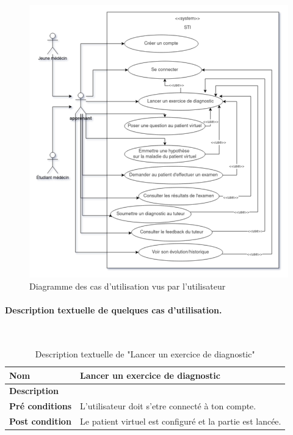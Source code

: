     \begin{figure}[H]
        \centering
        \includegraphics[width=\textwidth]{figures/context-Use case Diagram.png}
        \captionsetup{justification=centering}
        \caption{Diagramme des cas d'utilisation vus par l'utilisateur}
        \label{fig:use_case_user}
    \end{figure}
    \paragraph{Description textuelle de quelques cas d'utilisation.} \hfill \\
    
    \begin{table}[H]
        \centering
        \begin{tabular}{|p{}|p{}|}
            \hline
            \textbf{Nom} &  Lancer un exercice de diagnostic\\
            \hline
            \textbf{Description}& \\ 
            \hline
            \textbf{Pré conditions}& L'utilisateur doit s'etre connecté à ton compte.\\ 
            \hline
            \textbf{Post condition}& Le patient virtuel est configuré et la partie est lancée.\\ 
            \hline
        \end{tabular}
        
        \captionsetup{justification=centering}
        \caption{Description textuelle de "Lancer un exercice de diagnostic"}
        \label{tab:exercice_use_case}
    \end{table}
    
